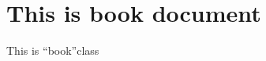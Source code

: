 \documentclass[a4papper, 12pt]{book}
\begin{document}
\chapter{This is book document}
This is \textquotedblleft book\textquotedblright class
\end{document}
